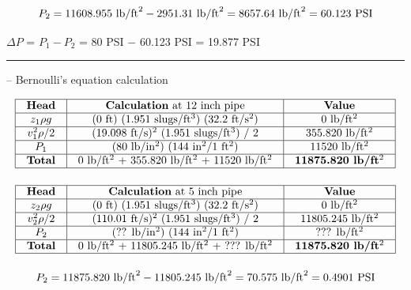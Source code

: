 $$P_2 = 11608.955 \hbox{ lb/ft}^2 - 2951.31 \hbox{ lb/ft}^2 = 8657.64 \hbox{ lb/ft}^2 = 60.123 \hbox{ PSI}$$

\vskip 10pt

$\Delta P$ = $P_1 - P_2$ = 80 PSI $-$ 60.123 PSI = 19.877 PSI


\filbreak \vskip 5pt \hrule \vskip 5pt  -- Bernoulli's equation calculation \vskip 10pt


$$\vbox{\offinterlineskip
\halign{\strut
\vrule \quad\hfil # \ \hfil & 
\vrule \quad\hfil # \ \hfil & 
\vrule \quad\hfil # \ \hfil \vrule \cr
\noalign{\hrule}
%
{\bf Head} & {\bf Calculation} at 12 inch pipe & {\bf Value} \cr
%
\noalign{\hrule}
%
$z_1 \rho g$ & (0 ft) (1.951 slugs/ft$^{3}$) (32.2 ft/s$^{2}$) & 0 lb/ft$^{2}$ \cr
%
\noalign{\hrule}
%
$v_1^2 \rho / 2$ & (19.098 ft/s)$^{2}$ (1.951 slugs/ft$^{3}$) / 2 & 355.820 lb/ft$^{2}$ \cr
%
\noalign{\hrule}
%
$P_1$ & (80 lb/in$^{2}$) (144 in$^{2}$/1 ft$^{2}$) & 11520 lb/ft$^{2}$ \cr
%
\noalign{\hrule}
%
{\bf Total} &  0 lb/ft$^{2}$ + 355.820 lb/ft$^{2}$ + 11520 lb/ft$^{2}$ & {\bf 11875.820 lb/ft$^{2}$} \cr
%
\noalign{\hrule}
} %
}$$ %

\vskip 10pt


$$\vbox{\offinterlineskip
\halign{\strut
\vrule \quad\hfil # \ \hfil & 
\vrule \quad\hfil # \ \hfil & 
\vrule \quad\hfil # \ \hfil \vrule \cr
\noalign{\hrule}
%
{\bf Head} & {\bf Calculation} at 5 inch pipe & {\bf Value} \cr
%
\noalign{\hrule}
%
$z_2 \rho g$ & (0 ft) (1.951 slugs/ft$^{3}$) (32.2 ft/s$^{2}$) & 0 lb/ft$^{2}$ \cr
%
\noalign{\hrule}
%
$v_2^2 \rho / 2$ & (110.01 ft/s)$^{2}$ (1.951 slugs/ft$^{3}$) / 2 & 11805.245 lb/ft$^{2}$ \cr
%
\noalign{\hrule}
%
$P_2$ & (?? lb/in$^{2}$) (144 in$^{2}$/1 ft$^{2}$) & ??? lb/ft$^{2}$ \cr
%
\noalign{\hrule}
%
{\bf Total} &  0 lb/ft$^{2}$ + 11805.245 lb/ft$^{2}$ + ??? lb/ft$^{2}$ & {\bf 11875.820 lb/ft$^{2}$} \cr
%
\noalign{\hrule}
} %
}$$ %

$$P_2 = 11875.820 \hbox{ lb/ft}^2 - 11805.245 \hbox{ lb/ft}^2 = 70.575 \hbox{ lb/ft}^2 = 0.4901 \hbox{ PSI}$$

